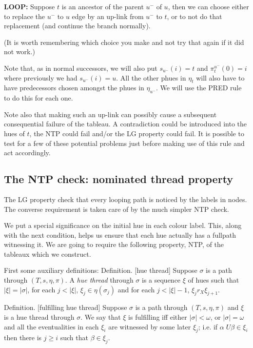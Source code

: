 \documentclass[submission,copyright,creativecommons]{eptcs}
\newcommand{\unt}{\;{U}}
\newenvironment{definition}{Definition. }{}
\begin{document}
{\bf LOOP:}
Suppose $t$ is an ancestor of the parent $u^-$ of $u$,
 then we can choose either to replace the $u^-$ to $u$ edge by an up-link from $u^-$ to $t$, or to not do that replacement (and continue the branch normally).

(It is worth remembering which choice you make and not try that again if it did not work.)

Note that, as in normal successors, we will also put
$s_{u^-}(i)=t$ and $\pi^{u^-}_t(0)=i$
where 
previously we had
$s_{u^-}(i)=u$.
All the other phues in $\eta_t$ will also have to have
predecessors chosen amongst the phues in
$\eta_{u^-}$. We will use the PRED rule to do this for each one.

Note also that making such an up-link can possibly cause
a subsequent consequential failure of the tableau.
A contradiction could be introduced into the hues of $t$,
the NTP could fail and/or the LG property could fail.
It is possible to test for a few of these potential problems
just before making use of this rule and act accordingly.

\subsection{The NTP check: nominated thread property}

The LG property check that
every looping path 
is noticed by the
labels in nodes.
The converse requirement is taken care
of by the much simpler NTP check.

We put a
special significance on the initial
hue in each colour label.
This, along with the next condition,
helps us ensure that each hue
actually has a fullpath
witnessing it.
We are going to require the following 
property, NTP,
of the tableaux which we construct.

First some auxiliary definitions:
\begin{definition}[hue thread]
Suppose $\sigma$ is a path through $(T,s,\eta,\pi)$.
A {\em hue thread} through $\sigma$
is
a sequence $\xi$ of hues such that
$|\xi|=|\sigma|$,
for each $j<|\xi|$, $\xi_j \in \eta(\sigma_j)$
and for each $j<|\xi|-1$,
$\xi_j r_X \xi_{j+1}$.
\end{definition}

\begin{definition}[fulfilling hue thread]
Suppose $\sigma$ is a path through  $(T,s,\eta,\pi)$
and $\xi$ is a  hue thread through $\sigma$.
We say that $\xi$ is fulfilling iff
either $|\sigma|<\omega$,
or 
 $|\sigma|=\omega$ and all the eventualities in each
$\xi_i$ are witnessed
by some later $\xi_j$;
i.e.
if $\alpha \unt \beta \in \xi_i$
then there is $j \geq i$
such that
$\beta \in \xi_j$.
\end{definition}
\end{document}
